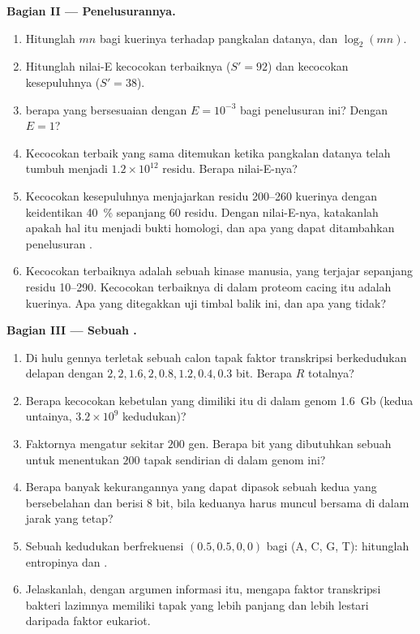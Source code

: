\begin{problem}
\medskip
\noindent\textbf{Bagian II --- Penelusurannya.}
\begin{enumerate}[resume]
  \item Hitunglah $mn$ bagi kuerinya terhadap pangkalan datanya, dan
        $\log_{2}(mn)$.
  \item Hitunglah nilai-E kecocokan terbaiknya ($S' = 92$) dan kecocokan
        kesepuluhnya ($S' = 38$).
  \item {} berapa yang bersesuaian dengan $E = 10^{-3}$ bagi
        penelusuran ini? Dengan $E = 1$?
  \item Kecocokan terbaik yang sama ditemukan ketika pangkalan datanya telah
        tumbuh menjadi $1.2\times 10^{12}$ residu. Berapa nilai-E-nya?
  \item Kecocokan kesepuluhnya menjajarkan residu 200--260 kuerinya dengan
        keidentikan \qty{40}{\%} sepanjang $60$ residu. Dengan nilai-E-nya,
        katakanlah apakah hal itu menjadi bukti homologi, dan apa yang dapat
        ditambahkan penelusuran .
  \item Kecocokan terbaiknya adalah sebuah kinase manusia, yang terjajar
        sepanjang residu 10--290. Kecocokan terbaiknya di dalam proteom
        cacing itu adalah kuerinya. Apa yang ditegakkan uji timbal balik ini,
        dan apa yang tidak?
\end{enumerate}

\medskip
\noindent\textbf{Bagian III --- Sebuah .}
\begin{enumerate}[resume]
  \item Di hulu gennya terletak sebuah calon tapak faktor transkripsi
        berkedudukan delapan dengan 
        $2, 2, 1.6, 2, 0.8, 1.2, 0.4, 0.3$ bit. Berapa $R$ totalnya?
  \item Berapa kecocokan kebetulan yang dimiliki  itu di dalam genom
        \qty{1.6}{Gb} (kedua untainya, $3.2\times 10^{9}$
        kedudukan)?
  \item Faktornya mengatur sekitar $200$ gen. Berapa bit yang dibutuhkan
        sebuah  untuk menentukan $200$ tapak sendirian di dalam genom ini?
  \item Berapa banyak kekurangannya yang dapat dipasok sebuah  kedua
        yang bersebelahan dan berisi $8$ bit, bila keduanya harus muncul
        bersama di dalam jarak yang tetap?
  \item Sebuah kedudukan berfrekuensi $(0.5, 0.5, 0, 0)$ bagi (A, C, G,
        T): hitunglah entropinya dan .
  \item Jelaskanlah, dengan argumen informasi itu, mengapa faktor
        transkripsi bakteri lazimnya memiliki tapak yang lebih panjang dan
        lebih lestari daripada faktor eukariot.
\end{enumerate}


\end{problem}
